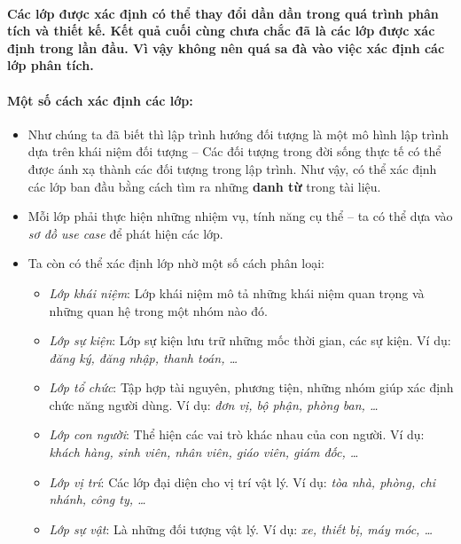 \documentclass{article}
\begin{document}
      \paragraph{\textnormal{
        Các lớp được xác định có thể thay đổi dần dần trong quá trình phân tích và thiết kế. Kết quả cuối cùng chưa chắc đã là các lớp được xác định trong lần đầu. Vì vậy không nên quá sa đà vào việc xác định các lớp phân tích.
      }}

      \paragraph{\textnormal{
        Một số cách xác định các lớp:
      }}
      \begin{itemize}
        \item Như chúng ta đã biết thì lập trình hướng đối tượng là một mô hình lập trình dựa trên khái niệm đối tượng -- Các đối tượng trong đời sống thực tế có thể được ánh xạ thành các đối tượng trong lập trình. Như vậy, có thể xác định các lớp ban đầu bằng cách tìm ra những \textbf{danh từ} trong tài liệu.
        \item Mỗi lớp phải thực hiện những nhiệm vụ, tính năng cụ thể -- ta có thể dựa vào \textit{sơ đồ use case} để phát hiện các lớp.
        \item Ta còn có thể xác định lớp nhờ một số cách phân loại:
        \begin{itemize}
          \item \textit{Lớp khái niệm}: Lớp khái niệm mô tả những khái niệm quan trọng và những quan hệ trong một nhóm nào đó.
          \item \textit{Lớp sự kiện}: Lớp sự kiện lưu trữ những mốc thời gian, các sự kiện. Ví dụ: \textit{đăng ký, đăng nhập, thanh toán, \ldots}
          \item \textit{Lớp tổ chức}: Tập hợp tài nguyên, phương tiện, những nhóm giúp xác định chức năng người dùng. Ví dụ: \textit{đơn vị, bộ phận, phòng ban, \ldots}
          \item \textit{Lớp con người}: Thể hiện các vai trò khác nhau của con người. Ví dụ: \textit{khách hàng, sinh viên, nhân viên, giáo viên, giám đốc, \ldots}
          \item \textit{Lớp vị trí}: Các lớp đại diện cho vị trí vật lý. Ví dụ: \textit{tòa nhà, phòng, chi nhánh, công ty, \ldots}
          \item \textit{Lớp sự vật}: Là những đối tượng vật lý. Ví dụ: \textit{xe, thiết bị, máy móc, \ldots}
        \end{itemize}
      \end{itemize}
    
\end{document}
